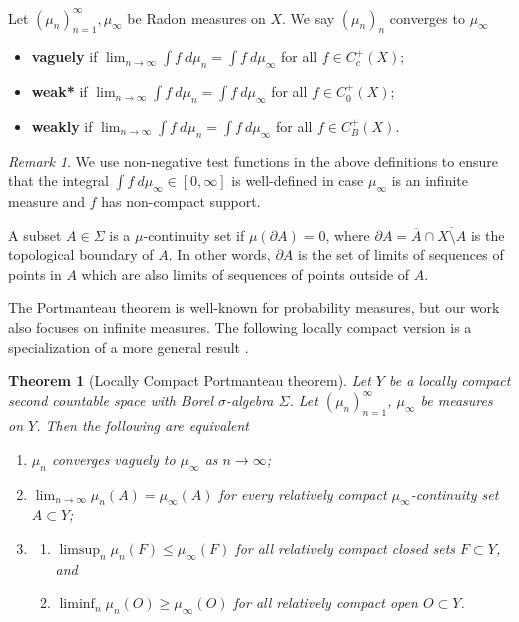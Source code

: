\documentclass[12pt]{article}
\theoremstyle{plain}
\newtheorem{thm}{Theorem}[section]
\theoremstyle{definition}
\theoremstyle{remark}
\newtheorem{remark}{Remark}
\newcommand{\Si}{\Sigma}
\newcommand\s{\sigma}
\begin{document}
Let $(\mu_n)_{n=1}^\infty, \mu_\infty$ be Radon measures on $X$. We say $(\mu_n)_n$ converges to $\mu_\infty$
\begin{itemize}
    \item {\bf vaguely} if $\lim_{n\to\infty} \int f ~d\mu_n = \int f ~d\mu_\infty$ for all $f\in C_c^+(X)$;
      \item {\bf weak*} if  $\lim_{n\to\infty} \int f ~d\mu_n = \int f ~d\mu_\infty$ for all $f\in C_0^+(X)$;
    \item  {\bf weakly} if $\lim_{n\to\infty} \int f ~d\mu_n = \int f ~d\mu_\infty$ for all $f\in C_B^+(X)$.
\end{itemize}

\begin{remark}
We use non-negative test functions in the above definitions to ensure that the integral $\int f~d\mu_\infty\in [0,\infty]$ is well-defined in case $\mu_\infty$ is an infinite measure and $f$ has non-compact support.
\end{remark}


A subset $A \in \Si$ is a $\mu$-continuity set if $\mu(\partial A) = 0$, where $\partial A = \overline{A}\cap \overline{X \setminus A}$ is the topological boundary of $A$. In other words, $\partial A$ is the set of limits of sequences of points in $A$ which are also limits of sequences of points outside of $A$.


The Portmanteau theorem is well-known for probability measures, but our work also focuses on infinite measures. The following locally compact version is a specialization of a more general result \cite{MR2271177}.

\begin{thm}[Locally Compact Portmanteau theorem]\label{T:portmanteau}
    Let $Y$ be a locally compact second countable space with Borel $\s$-algebra $\Si$.  Let $(\mu_n)^\infty_{n=1}$, $\mu_\infty$ be measures on $Y$. Then the following are equivalent
        \begin{enumerate}\itemsep0em
\item $\mu_n$ converges vaguely to $\mu_\infty$ as $n\to\infty$;
\item $\lim_{n\to\infty} \mu_n(A)=\mu_\infty(A)$ for every relatively compact $\mu_\infty$-continuity set $A\subset Y$;
        \item 
        \begin{enumerate}
            \item 
        $\limsup_n \mu_n(F) \leq \mu_\infty(F)$ for all relatively compact closed sets $F \subset Y$, and
        \item $\liminf_n \mu_n(O) \geq \mu_\infty(O)$ for all relatively compact open $O \subset Y$. 
        \end{enumerate}
    \end{enumerate}
    \end{thm}
\end{document}
